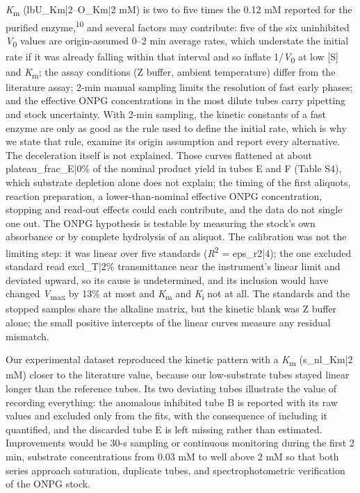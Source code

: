 \documentclass[9pt,twocolumn]{extarticle}
\newcommand{\cit}[1]{\textsuperscript{#1}}
\newcommand{\Km}{\textit{K}\textsubscript{m}}
\newcommand{\Vmax}{\textit{V}\textsubscript{max}}
\newcommand{\Vo}{\textit{V}\textsubscript{0}}
\newcommand{\Ki}{\textit{K}\textsubscript{i}}
\newcommand{\Rsq}{\textit{R}\textsuperscript{2}}
\newcommand{\dash}{–}
\begin{document}
\Km{} ({{lbU_Km|2}}\dash{{O_Km|2}} mM) is two to five times the 0.12 mM reported for the purified enzyme,\cit{10} and several factors may contribute: five of the six uninhibited \Vo{} values are origin-assumed 0\dash 2 min average rates, which understate the initial rate if it was already falling within that interval and so inflate 1/\Vo{} at low [S] and \Km; the assay conditions (Z buffer, ambient temperature) differ from the literature assay; 2-min manual sampling limits the resolution of fast early phases; and the effective ONPG concentrations in the most dilute tubes carry pipetting and stock uncertainty. With 2-min sampling, the kinetic constants of a fast enzyme are only as good as the rule used to define the initial rate, which is why we state that rule, examine its origin assumption and report every alternative. The deceleration itself is not explained. Those curves flattened at about {{plateau_frac_E|0}}\% of the nominal product yield in tubes E and F (Table S4), which substrate depletion alone does not explain; the timing of the first aliquots, reaction preparation, a lower-than-nominal effective ONPG concentration, stopping and read-out effects could each contribute, and the data do not single one out. The ONPG hypothesis is testable by measuring the stock's own absorbance or by complete hydrolysis of an aliquot. The calibration was not the limiting step: it was linear over five standards (\Rsq{} = {{eps_r2|4}}); the one excluded standard read {{excl_T|2}}\% transmittance near the instrument's linear limit and deviated upward, so its cause is undetermined, and its inclusion would have changed \Vmax{} by 13\% at most and \Km{} and \Ki{} not at all. The standards and the stopped samples share the alkaline matrix, but the kinetic blank was Z buffer alone; the small positive intercepts of the linear curves measure any residual mismatch.

Our experimental dataset reproduced the kinetic pattern with a \Km{} ({{s_nl_Km|2}} mM) closer to the literature value, because our low-substrate tubes stayed linear longer than the reference tubes. Its two deviating tubes illustrate the value of recording everything: the anomalous inhibited tube B is reported with its raw values and excluded only from the fits, with the consequence of including it quantified, and the discarded tube E is left missing rather than estimated. Improvements would be 30-s sampling or continuous monitoring during the first 2 min, substrate concentrations from 0.03 mM to well above 2 mM so that both series approach saturation, duplicate tubes, and spectrophotometric verification of the ONPG stock.
\end{document}
